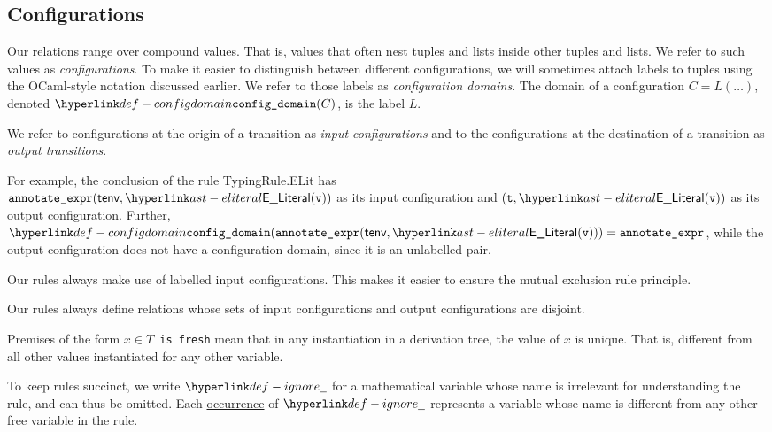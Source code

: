 \hypertarget{def-configuration}{}
\subsection{Configurations}

\hypertarget{def-configdomain}{}
Our relations range over compound values. That is, values that often nest tuples and lists inside other tuples and lists.
We refer to such values as \emph{configurations}. To make it easier to distinguish between different configurations,
we will sometimes attach labels to tuples using the OCaml-style notation discussed earlier.
We refer to those labels as \emph{configuration domains}.
The domain of a configuration $C=L(\ldots)$, denoted $\configdomain{C}$, is the label $L$.

We refer to configurations at the origin of a transition as \emph{input configurations} and to the
configurations at the destination of a transition as \emph{output transitions}.

For example, the conclusion of the rule TypingRule.ELit has \\
$\texttt{annotate\_expr}(\tenv, \ELiteral(\vv))$ as its input configuration
and $(\vt, \ELiteral(\vv))$ as its output configuration.
Further, \\
$\configdomain{\texttt{annotate\_expr}(\tenv, \ELiteral(\vv))} = \texttt{annotate\_expr}$,
while the output configuration does not have a configuration domain, since it is an unlabelled pair.

Our rules always make use of labelled input configurations. This makes it easier to ensure
the mutual exclusion rule principle.

Our rules always define relations whose sets of input configurations and output configurations are disjoint.

\hypertarget{def-freshvariables}{}
\begin{definition}
  Premises of the form \texttt{$x\in T$ is fresh} mean that in any
  instantiation in a derivation tree, the value of $x$ is unique.
  That is, different from all other values instantiated for any other variable.
\end{definition}

\hypertarget{def-ignore}{}
\begin{definition}
To keep rules succinct, we write $\Ignore$ for a mathematical variable whose name is
irrelevant for understanding the rule, and can thus be omitted.
Each \underline{occurrence} of $\Ignore$ represents a variable whose name is
different from any other free variable in the rule.
\end{definition}

